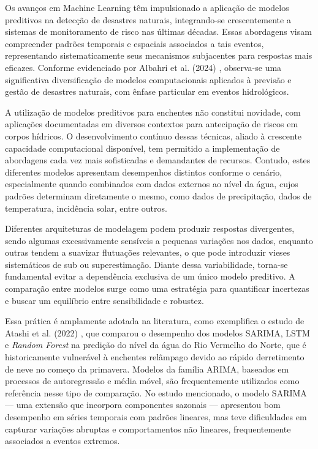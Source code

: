 
Os avanços em Machine Learning têm impulsionado a aplicação de modelos preditivos na detecção de desastres naturais,
integrando-se crescentemente a sistemas de monitoramento de risco nas últimas décadas. Essas abordagens visam
compreender padrões temporais e espaciais associados a tais eventos, representando sistematicamente seus mecanismos
subjacentes para respostas mais eficazes. Conforme evidenciado por Albahri et al. (2024) \cite{albahri}, observa-se uma
significativa diversificação de modelos computacionais aplicados à previsão e gestão de desastres naturais, com ênfase
particular em eventos hidrológicos.

A utilização de modelos preditivos para enchentes não constitui novidade, com aplicações documentadas em diversos
contextos para antecipação de riscos em corpos hídricos. O desenvolvimento contínuo dessas técnicas, aliado à crescente
capacidade computacional disponível, tem permitido a implementação de abordagens cada vez mais sofisticadas e
demandantes de recursos. Contudo, estes diferentes modelos apresentam desempenhos distintos conforme o cenário,
especialmente quando combinados com dados externos ao nível da água, cujos padrões determinam diretamente o mesmo, como
dados de precipitação, dados de temperatura, incidência solar, entre outros. 

Diferentes arquiteturas de modelagem podem produzir respostas divergentes, sendo algumas excessivamente sensíveis a
pequenas variações nos dados, enquanto outras tendem a suavizar flutuações relevantes, o que pode introduzir vieses
sistemáticos de sub ou superestimação. Diante dessa variabilidade, torna-se fundamental evitar a dependência exclusiva
de um único modelo preditivo. A comparação entre modelos surge como uma estratégia para quantificar incertezas e buscar
um equilíbrio entre sensibilidade e robustez.

Essa prática é amplamente adotada na literatura, como exemplifica o estudo de Atashi et al. (2022) \cite{atashi}, que
comparou o desempenho dos modelos SARIMA, LSTM e \textit{Random Forest} na predição do nível da água do Rio Vermelho do
Norte, que é historicamente vulnerável à enchentes relâmpago devido ao rápido derretimento de neve no começo da
primavera. Modelos da família ARIMA, baseados em processos de autoregressão e média móvel, são frequentemente utilizados
como referência nesse tipo de comparação. No estudo mencionado, o modelo SARIMA — uma extensão que incorpora componentes
sazonais — apresentou bom desempenho em séries temporais com padrões lineares, mas teve dificuldades em capturar
variações abruptas e comportamentos não lineares, frequentemente associados a eventos extremos.

